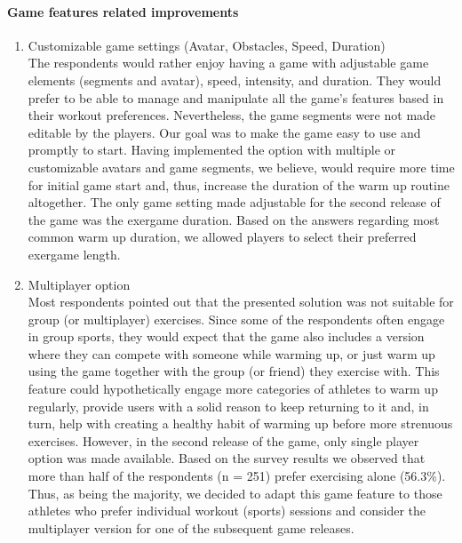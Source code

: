 \paragraph{Game features related improvements}
\begin{enumerate}
	\item Customizable game settings (Avatar, Obstacles, Speed, Duration)\\
The respondents would rather enjoy having a game with adjustable game elements (segments and avatar), speed, intensity, and duration. They would prefer to be able to manage and manipulate all the game's features based in their workout preferences. Nevertheless, the game segments were not made editable by the players. Our goal was to make the game easy to use and promptly to start. Having implemented the option with multiple or customizable avatars and game segments, we believe, would require more time for initial game start and, thus, increase the duration of the warm up routine altogether. The only game setting made adjustable for the second release of the game was the exergame duration. Based on the answers regarding most common warm up duration, we allowed players to select their preferred exergame length. 
\item Multiplayer option\\
Most respondents pointed out that the presented solution was not suitable for group (or multiplayer) exercises. Since some of the respondents often engage in group sports, they would expect that the game also includes a version where they can compete with someone while warming up, or just warm up using the game together with the group (or friend) they exercise with. This feature could hypothetically engage more categories of athletes to warm up regularly, provide users with a solid reason to keep returning to it and, in turn, help with creating a healthy habit of warming up before more strenuous exercises. However, in the second release of the game, only single player option was made available. Based on the survey results we observed that more than half of the respondents (n = 251) prefer exercising alone (56.3\%). Thus, as being the majority, we decided to adapt this game feature to those athletes who prefer individual workout (sports) sessions and consider the multiplayer version for one of the subsequent game releases. 
\end{enumerate}
